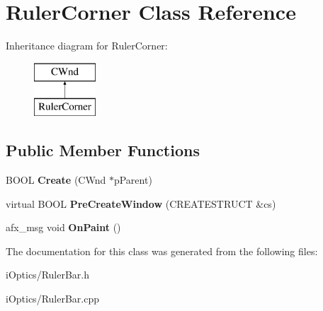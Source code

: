 \hypertarget{class_ruler_corner}{}\section{Ruler\+Corner Class Reference}
\label{class_ruler_corner}
Inheritance diagram for Ruler\+Corner\+:\begin{figure}[H]
\begin{center}
\leavevmode
\includegraphics[height=2.000000cm]{class_ruler_corner}
\end{center}
\end{figure}
\subsection*{Public Member Functions}
\begin{DoxyCompactItemize}
\item 
\mbox{\label{class_ruler_corner_a6f70a4658f3ea03d26c5ba424c58faa4}} 
B\+O\+OL {\bfseries Create} (C\+Wnd $\ast$p\+Parent)
\item 
\mbox{\label{class_ruler_corner_ac078b0f0fe0e57fc15dbf94b9c4178fe}} 
virtual B\+O\+OL {\bfseries Pre\+Create\+Window} (C\+R\+E\+A\+T\+E\+S\+T\+R\+U\+CT \&cs)
\item 
\mbox{\label{class_ruler_corner_ac9bf41b0ada5824789c42c4932487121}} 
afx\+\_\+msg void {\bfseries On\+Paint} ()
\end{DoxyCompactItemize}


The documentation for this class was generated from the following files\+:\begin{DoxyCompactItemize}
\item 
i\+Optics/Ruler\+Bar.\+h\item 
i\+Optics/Ruler\+Bar.\+cpp\end{DoxyCompactItemize}
